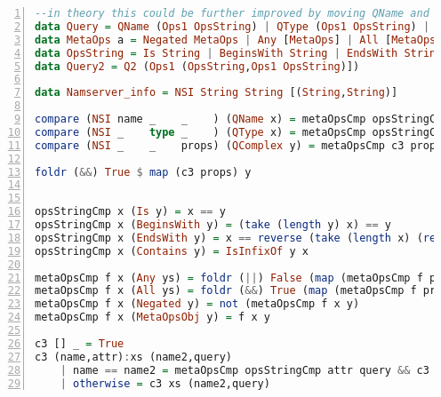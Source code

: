 \begin{lstlisting}[caption={Originally intended Query System (haskell pseudocode)}, 
label=lst:rpc_calls_1, numbers=left, stepnumber=1, float, floatplacement=tl, 
frame=tb, language=haskell]
--in theory this could be further improved by moving QName and QType in as pseudo props or actual props as described in the text
data Query = QName (Ops1 OpsString) | QType (Ops1 OpsString) | QComplex Query2
data MetaOps a = Negated MetaOps | Any [MetaOps] | All [MetaOps] | MetaOpsObj a
data OpsString = Is String | BeginsWith String | EndsWith String | Contains String
data Query2 = Q2 (Ops1 (OpsString,Ops1 OpsString)])

data Namserver_info = NSI String String [(String,String)]

compare (NSI name _    _    ) (QName x) = metaOpsCmp opsStringCmp name x
compare (NSI _    type _    ) (QType x) = metaOpsCmp opsStringCmp type x
compare (NSI _    _    props) (QComplex y) = metaOpsCmp c3 props y

foldr (&&) True $ map (c3 props) y


opsStringCmp x (Is y) = x == y
opsStringCmp x (BeginsWith y) = (take (length y) x) == y
opsStringCmp x (EndsWith y) = x == reverse (take (length x) (reverse y))
opsStringCmp x (Contains y) = IsInfixOf y x

metaOpsCmp f x (Any ys) = foldr (||) False (map (metaOpsCmp f props) ys)
metaOpsCmp f x (All ys) = foldr (&&) True (map (metaOpsCmp f props) ys)
metaOpsCmp f x (Negated y) = not (metaOpsCmp f x y)
metaOpsCmp f x (MetaOpsObj y) = f x y

c3 [] _ = True
c3 (name,attr):xs (name2,query)
	| name == name2 = metaOpsCmp opsStringCmp attr query && c3 xs (name2,query)
	| otherwise = c3 xs (name2,query)

\end{lstlisting}
